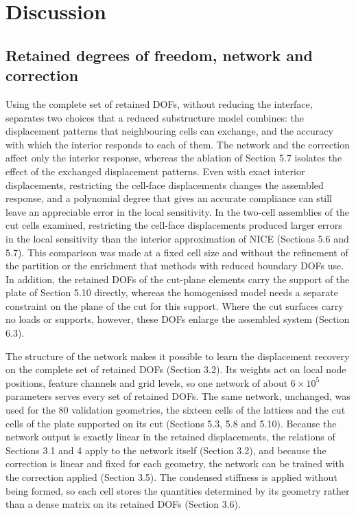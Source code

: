 \documentclass[preprint,12pt,authoryear]{elsarticle}
\begin{document}
\section{Discussion}

\subsection{Retained degrees of freedom, network and correction}

Using the complete set of retained DOFs, without reducing the interface, separates two choices that a reduced substructure model combines: the displacement patterns that neighbouring cells can exchange, and the accuracy with which the interior responds to each of them. The network and the correction affect only the interior response, whereas the ablation of Section 5.7 isolates the effect of the exchanged displacement patterns. Even with exact interior displacements, restricting the cell-face displacements changes the assembled response, and a polynomial degree that gives an accurate compliance can still leave an appreciable error in the local sensitivity. In the two-cell assemblies of the cut cells examined, restricting the cell-face displacements produced larger errors in the local sensitivity than the interior approximation of NICE (Sections 5.6 and 5.7). This comparison was made at a fixed cell size and without the refinement of the partition or the enrichment that methods with reduced boundary DOFs use. In addition, the retained DOFs of the cut-plane elements carry the support of the plate of Section 5.10 directly, whereas the homogenised model needs a separate constraint on the plane of the cut for this support. Where the cut surfaces carry no loads or supports, however, these DOFs enlarge the assembled system (Section 6.3).

The structure of the network makes it possible to learn the displacement recovery on the complete set of retained DOFs (Section 3.2). Its weights act on local node positions, feature channels and grid levels, so one network of about \(6\times10^5\) parameters serves every set of retained DOFs. The same network, unchanged, was used for the 80 validation geometries, the sixteen cells of the lattices and the cut cells of the plate supported on its cut (Sections 5.3, 5.8 and 5.10). Because the network output is exactly linear in the retained displacements, the relations of Sections 3.1 and 4 apply to the network itself (Section 3.2), and because the correction is linear and fixed for each geometry, the network can be trained with the correction applied (Section 3.5). The condensed stiffness is applied without being formed, so each cell stores the quantities determined by its geometry rather than a dense matrix on its retained DOFs (Section 3.6).
\end{document}
